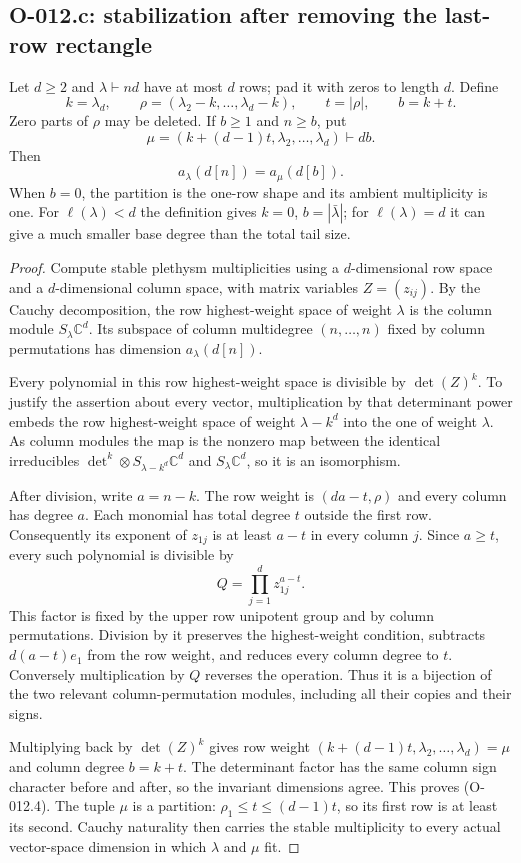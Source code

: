 \subsection{O-012.c: stabilization after removing the last-row rectangle}

Let $d\geq2$ and $\lambda\vdash nd$ have at most $d$ rows;
pad it with zeros to length $d$. Define
\[
 k=\lambda_d,\qquad
 \rho=(\lambda_2-k,\ldots,\lambda_d-k),\qquad
 t=|\rho|,\qquad b=k+t.
\]
Zero parts of $\rho$ may be deleted. If $b\geq1$ and $n\geq b$,
put
\[
       \mu=(k+(d-1)t,\lambda_2,\ldots,\lambda_d)\vdash db.
\]
Then
\[
                         a_\lambda(d[n])=a_\mu(d[b]).  \tag{O-012.4}
\]
When $b=0$, the partition is the one-row shape and its ambient
multiplicity is one. For $\ell(\lambda)<d$ the definition gives
$k=0$, $b=|\bar\lambda|$; for $\ell(\lambda)=d$ it can
give a much smaller base degree than the total tail size.

\begin{proof}
Compute stable plethysm multiplicities using a $d$-dimensional
row space and a $d$-dimensional column space, with matrix
variables $Z=(z_{ij})$. By the Cauchy decomposition, the row
highest-weight space of weight $\lambda$ is the column module
$S_\lambda\mathbb C^d$. Its subspace of column multidegree
$(n,\ldots,n)$ fixed by column permutations has dimension
$a_\lambda(d[n])$.

Every polynomial in this row highest-weight space is divisible
by $\det(Z)^k$. To justify the assertion about every vector,
multiplication by that determinant power embeds the row
highest-weight space of weight $\lambda-k^d$ into the one
of weight $\lambda$. As column modules the map is the nonzero
map between the identical irreducibles
$\det^k\otimes S_{\lambda-k^d}\mathbb C^d$ and
$S_\lambda\mathbb C^d$, so it is an isomorphism.

After division, write $a=n-k$. The row weight is
$(da-t,\rho)$ and every column has degree $a$.
Each monomial has total degree $t$ outside the first row.
Consequently its exponent of $z_{1j}$ is at least $a-t$
in every column $j$. Since $a\geq t$, every such polynomial
is divisible by
\[
                         Q=\prod_{j=1}^d z_{1j}^{a-t}.
\]
This factor is fixed by the upper row unipotent group and by
column permutations. Division by it preserves the highest-weight
condition, subtracts $d(a-t)e_1$ from the row weight, and
reduces every column degree to $t$. Conversely multiplication
by $Q$ reverses the operation. Thus it is a bijection of the
two relevant column-permutation modules, including all their
copies and their signs.

Multiplying back by $\det(Z)^k$ gives row weight
$(k+(d-1)t,\lambda_2,\ldots,\lambda_d)=\mu$ and
column degree $b=k+t$. The determinant factor has the same
column sign character before and after, so the invariant
dimensions agree. This proves (O-012.4). The tuple $\mu$ is
a partition: $\rho_1\leq t\leq(d-1)t$, so its first
row is at least its second. Cauchy naturality then carries
the stable multiplicity to every actual vector-space dimension
in which $\lambda$ and $\mu$ fit.
\end{proof}

